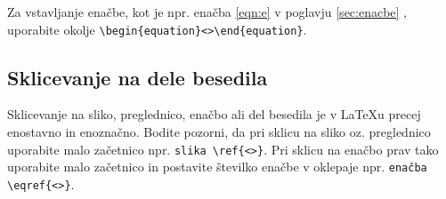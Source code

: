 Za vstavljanje enačbe, kot je npr. enačba \eqref{eqn:e} v poglavju \ref{sec:enacbe} , uporabite okolje \verb|\begin{equation}<>\end{equation}|.

\subsection{Sklicevanje na dele besedila}\label{sec:sklici}

Sklicevanje na sliko, preglednico, enačbo ali del besedila je v \LaTeX u precej enostavno in enoznačno. Bodite pozorni, da pri sklicu na sliko oz. preglednico uporabite malo začetnico npr. \verb|slika \ref{<>}|. Pri sklicu na enačbo prav tako uporabite malo začetnico in postavite številko enačbe v oklepaje npr. \verb|enačba \eqref{<>}|.









